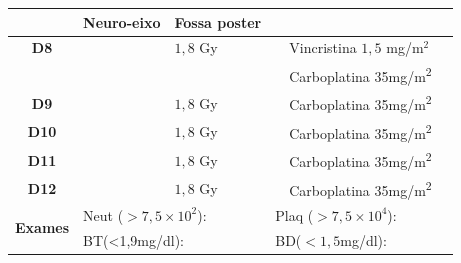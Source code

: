 \documentclass[11pt,a4paper,oldfontcommands]{memoir}
\begin{document}
\begin{center}
\begin{longtable}{p{1cm}p{2cm}|p{2cm}|p{1cm}|p{4cm}|p{3cm}}
    \cline{2-3}
    \multicolumn{1}{c|}{\multirow{1}{*}{}}&{Neuro-eixo}&{Fossa poster}&& \\
	\hline
	\multicolumn{1}{c|}{\multirow{1}{*}{\textbf{D8}}}&\multicolumn{1}{c|}{}&{\(1,8\) Gy}&&{Vincristina \(1,5\) mg/m\(^2\)}&\\
	\multicolumn{1}{c|}{\multirow{1}{*}{\textbf{}}}&\multicolumn{1}{c|}{}&&&{Carboplatina 35mg/m\textsuperscript{2}}&\\
    \multicolumn{1}{c|}{\multirow{1}{*}{\textbf{D9}}}&\multicolumn{1}{c|}{}&{\(1,8\) Gy}&&{Carboplatina 35mg/m\textsuperscript{2}}&\\
    \multicolumn{1}{c|}{\multirow{1}{*}{\textbf{D10}}}&\multicolumn{1}{c|}{}&{\(1,8\) Gy}&&{Carboplatina 35mg/m\textsuperscript{2}}&\\
    \multicolumn{1}{c|}{\multirow{1}{*}{\textbf{D11}}}&\multicolumn{1}{c|}{}&{\(1,8\) Gy}&&{Carboplatina 35mg/m\textsuperscript{2}}&\\
    \multicolumn{1}{c|}{\multirow{1}{*}{\textbf{D12}}}&\multicolumn{1}{c|}{}&{\(1,8\) Gy}&&{Carboplatina 35mg/m\textsuperscript{2}}&\\
    \hline
    \multicolumn{1}{c|}{\multirow{2}{*}{\textbf{Exames}}}&\multicolumn{2}{l|}{Neut (\(>7,5\times10^2\)):}&\multicolumn{2}{l|}{Plaq (\(>7,5\times10^4\)):}&\\
    \cline{2-6}
    \multicolumn{1}{c|}{\multirow{2}{*}{{}}}&\multicolumn{2}{l|}{BT(<1,9mg/dl):}&\multicolumn{2}{l|}{BD(\(<1,5\)mg/dl):}&\\
    \hline
\end{longtable}


\end{center}
\end{document}
